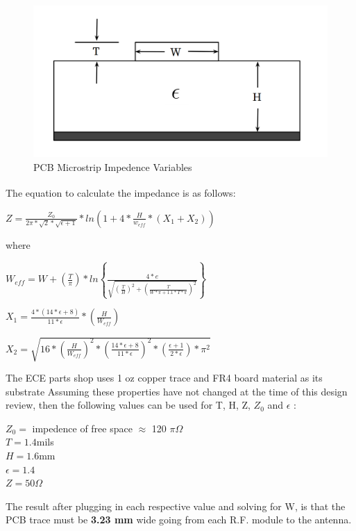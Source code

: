 \documentclass[letterpaper,10pt]{article}
\begin{document}
\begin{spacing}{1.15}
\begin{figure} [H]
	\centering
	\includegraphics[scale=0.3]{PCB_Trace_Figure.png}
	\caption{PCB Microstrip Impedence Variables\label{fig:pcb-trace}}
\end{figure}

The equation to calculate the impedance is as follows\textsuperscript{\cite{Microstrip}}:
\begin{center}
\large$Z = \frac{Z_0}{2\pi*\sqrt{2}*\sqrt{\epsilon+ 1}} * ln\left(1 + 4*\frac{H}{w_{eff}} * \left(X_1 + X_2 \right )\right )$
\end{center}
where
\begin{center}
	\large $W_{eff} = W + \left(\frac{T}{\pi}\right)*ln\left \{\frac{4*e}{\sqrt{\left(\frac{T}{H}\right)^2 + \left (\frac{T}{W*\pi + 1.1*T*\pi }  \right )^{2}}} \right \}$
	
	\vspace{2.5mm}
	
	$X_1 = \frac{4*\left( 14*\epsilon +8\right)}{11*\epsilon} * \left(\frac{H}{W_{eff}} \right)$
	
	\vspace{2.5mm}
	
	$X_2 = \sqrt{16*\left(\frac{H}{W_{eff}} \right )^2 * \left(\frac{14*\epsilon+8}{11*\epsilon} \right )^2 * \left(\frac{\epsilon + 1}{2*\epsilon} \right ) * \pi^2}$
\end{center}

The ECE parts shop uses 1 oz copper trace and FR4 board material as its substrate \cite{ECE-Electronics-Shop} Assuming these properties have not changed at the time of this design review, then the following values can be used for T, H, Z, $Z_0$ and $\epsilon$ :
\begin{center}
	$Z_0 =$ impedence of free space $\approx$ 120 $\pi \Omega$ \\
	$T = 1.4 $mils\\
	$H =1.6 $mm\\
	$\epsilon = 1.4$ \\
	$Z = 50 \Omega$
\end{center}
The result after plugging in each respective value and solving for W, is that the PCB trace must be \textbf{3.23 mm} wide going from each R.F. module to the antenna.



\end{spacing}
\end{document}
